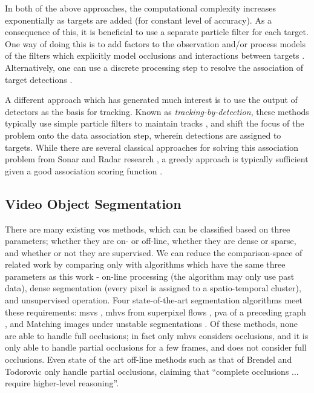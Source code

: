 In both of the above approaches, the computational complexity increases exponentially as targets are added (for constant level of accuracy). As a consequence of this, it is beneficial to use a separate particle filter for each target. One way of doing this is to add factors to the observation and/or process models of the filters which explicitly model occlusions and interactions between targets \cite{MCMCPartFilt_05, ApproxMultiTrack_06}. Alternatively, one can use a discrete processing step to resolve the association of target detections \cite{Koo_IROS2013}. 

A different approach which has generated much interest is to use the output of detectors as the basis for tracking. Known as \emph{tracking-by-detection}, these methods typically use simple particle filters to maintain tracks \cite{RobustVTMT_06,MultipersonTBD_011}, and shift the focus of the problem onto the data association step, wherein detections are assigned to targets. While there are several classical approaches for solving this association problem from Sonar and Radar research \cite{SonarMultiTrack_83,MultiTrack_79}, a greedy approach is typically sufficient given a good association scoring function \cite{DetTrackMultiHumans_07,MultipersonTBD_011}. 

\subsection{Video Object Segmentation}
There are many existing \gls{vos} methods, which can be classified based on three parameters; whether they are on- or off-line, whether they are dense or sparse, and whether or not they are supervised. We can reduce the comparison-space of related work by comparing only with algorithms which have the same three parameters as this work - on-line processing (the algorithm may only use past data), dense segmentation (every pixel is assigned to a spatio-temporal cluster), and unsupervised operation. Four state-of-the-art segmentation algorithms meet these requirements: \gls{msvs} \cite{MSVS}, \gls{mhvs} from superpixel flows \cite{MHVS}, \gls{pva} of a preceding graph \cite{PropValAgg}, and Matching images under unstable segmentations \cite{MatchingUnstable}.  Of these methods, none are able to handle full occlusions; in fact only \gls{mhvs} considers occlusions, and it is only able to handle partial occlusions for a few frames, and does not consider full occlusions. Even state of the art off-line methods such as that of Brendel and Todorovic \cite{SegTrackRegions} only handle partial occlusions, claiming that ``complete occlusions ... require higher-level reasoning''.  

